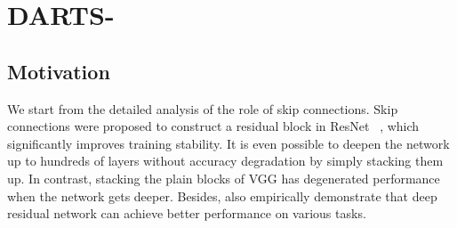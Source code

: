 \documentclass{article} \usepackage{iclr2021_conference,times}
\begin{document}
\section{DARTS-}


\begin{comment}
Following one-shot based NAS~ \citep{one-shot NAS}, DARTS~ \citep{liu2018darts} constructs neural networks by stacking normal and reduction cells and utilizes a directed acyclic graph (DAG) to represent the architecture of a cell. $N$ nodes, which represents a feature map, are contained in each cell in sequential order, and node $i$ connects with all the previous nodes in the same cell. We denote the edge from node $i$ to $j$ as $e_{i,j}$, which contains all the candidate operations in the search space $o_{i,j}, o\in \mathcal{O}$. Furthermore, DARTS~ \citep{liu2018darts} leads in the architecture parameters $\alpha_{i,j}^o$ to control the importance of different operations and connections. Consequently, the output of edge $e_{i,j}$, denoted as $\overline{o}_{i,j}$, is the weighted average of the output of operations $o_{i,j}$
\begin{equation}
\overline{o}_{i,j}(x_i) = \sum_{o\in \mathcal{O}}\frac{\exp(\alpha^o_{i,j})}{\sum_{o'\in \mathcal{O}}\exp(\alpha^{o'}_{i,j})} o_{i,j}(x_i)
\end{equation} 
where $x_i$ is the output of node $i$, and the output of node $j$ can be computed as:
\begin{equation}
x_j = \sum_{i<j} \overline{o}_{i,j}(x_i)
\end{equation} 
Neural architecture search can be modeled as a bilevel optimization problem as Eq.~\ref{eq:}, where $\omega$ is the network parameters and $\alpha$ is the architecture parameters:
\begin{align}
\min_\alpha  \quad &\mathcal{L}_{val}(\omega^*(\alpha), \alpha) \\
\text{s.t.} \quad &\omega^*(\alpha) = \text{argmin}_\omega \mathcal{L}_{train}(\omega, \alpha)
\end{align}
\end{comment}

\subsection{Motivation}


We start from the detailed analysis of the role of skip connections. Skip connections were proposed to construct a residual block in ResNet~ \citep{he2016deep}, which  significantly improves training stability.  It is even possible to deepen the network up to hundreds of layers without accuracy degradation by simply stacking them up. In contrast, stacking the plain blocks of VGG has degenerated performance when the network gets deeper. Besides, \cite{ren2015faster, wei2017boosting,tai2017image,li2018multi} also empirically demonstrate that deep residual network can achieve better performance on various tasks. 
\end{document}
